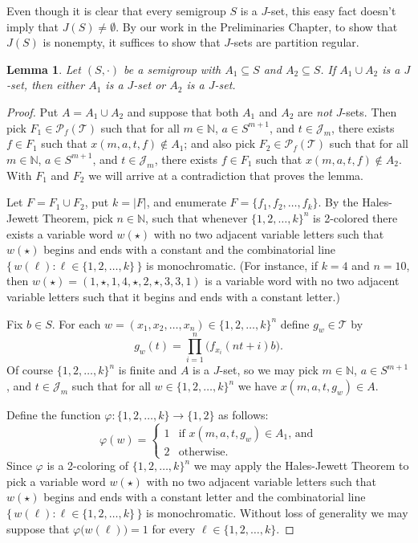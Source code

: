 \documentclass[12pt]{article}
\theoremstyle{plain}
\newtheorem{lem}[thm]{Lemma}
\theoremstyle{definition}
\newcommand{\bbN}{\mathbb{N}}
\newcommand{\calJ}{\mathcal{J}}
\newcommand{\calT}{\mathcal{T}}
\newcommand{\Pf}{\mathcal{P}_f}
\begin{document}
Even though it is clear that every semigroup $S$ is a $J$-set, this easy fact doesn't imply that $J(S) \ne \emptyset$. 
By our work in the Preliminaries Chapter, to show that $J(S)$ is nonempty, it suffices to show that $J$-sets are partition regular.

\begin{lem}
  Let $(S, \cdot)$ be a semigroup with $A_1 \subseteq S$ and $A_2 \subseteq S$.
  If $A_1 \cup A_2$ is a $J$-set, then either $A_1$ is a $J$-set or $A_2$ is a $J$-set.
\end{lem}
\begin{proof}
  Put $A = A_1 \cup A_2$ and suppose that both $A_1$ and $A_2$ are \textsl{not} $J$-sets. 
  Then pick $F_1 \in \Pf(\calT)$ such that for all $m \in \bbN$, $a \in S^{m+1}$, and $t \in \calJ_m$, there exists $f \in F_1$ such that $x(m, a, t, f) \not\in A_1$; and also pick $F_2 \in \Pf(\calT)$ such that for all $m \in \bbN$, $a \in S^{m+1}$, and $t \in \calJ_m$, there exists $f \in F_1$ such that $x(m, a, t, f) \not\in A_2$.
  With $F_1$ and $F_2$ we will arrive at a contradiction that proves the lemma.

  Let $F = F_1 \cup F_2$, put $k = |F|$, and enumerate $F = \{f_1, f_2, \ldots, f_k\}$.
  By the Hales-Jewett Theorem, pick $n \in \bbN$, such that whenever $\{1, 2, \ldots, k\}^n$ is 2-colored there exists a variable word $w(\star)$ with no two adjacent variable letters such that $w(\star)$ begins and ends with a constant and the combinatorial line $\bigl\{\, w(\ell) : \ell \in \{1, 2, \ldots, k\} \,\bigr\}$ is monochromatic. 
  (For instance, if $k = 4$ and $n = 10$, then $w(\star) = (1, \star, 1, 4, \star, 2, \star, 3, 3, 1)$ is a variable word with no two adjacent variable letters such that it begins and ends with a constant letter.)
  
  Fix $b \in S$.
  For each $w = (x_1, x_2, \ldots, x_n) \in \{1, 2, \ldots, k\}^n$ define $g_w \in \calT$ by 
  \[
    g_w(t) = \prod_{i=1}^n \bigl( f_{x_i}(nt + i)b \bigr).
  \]
  Of course $\{1, 2, \ldots, k\}^n$ is finite and $A$ is a $J$-set, so we may pick $m \in \bbN$, $a \in S^{m+1}$, and $t \in \calJ_m$ such that for all $w \in \{1, 2, \ldots, k\}^n$ we have $x(m, a, t, g_w) \in A$.

  Define the function $\varphi \colon \{1, 2, \ldots, k\} \to \{1, 2\}$ as follows:
  \[
    \varphi(w) = 
    \begin{cases}
      1 & \mbox{if $x(m, a, t, g_w) \in A_1$, and} \\
      2 & \mbox{otherwise.}
    \end{cases}
  \]
  Since $\varphi$ is a 2-coloring of $\{1, 2, \ldots, k\}^n$ we may apply the Hales-Jewett Theorem to pick a variable word $w(\star)$ with no two adjacent variable letters such that $w(\star)$ begins and ends with a constant letter and the combinatorial line $\bigl\{\, w(\ell) : \ell \in \{1, 2, \ldots, k\} \,\bigr\}$ is monochromatic. 
  Without loss of generality we may suppose that $\varphi \bigl( w(\ell) \bigr) = 1$ for every $\ell \in \{1, 2, \ldots, k\}$.


\end{proof}
\end{document}
